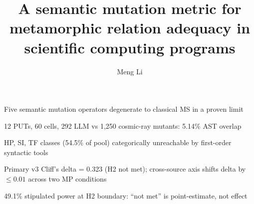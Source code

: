 \documentclass[review,12pt,authoryear]{elsarticle}
\begin{document}
\begin{frontmatter}

\title{A semantic mutation metric for metamorphic relation adequacy in scientific computing programs}

\author[a]{Meng Li}


\begin{highlights}
\item Five semantic mutation operators degenerate to classical MS in a proven limit
\item 12 PUTs, 60 cells, 292 LLM vs 1,250 cosmic-ray mutants: 5.14\% AST overlap
\item HP, SI, TF classes (54.5\% of pool) categorically unreachable by first-order syntactic tools
\item Primary v3 Cliff's delta = 0.323 (H2 not met); cross-source axis shifts delta by $\leq 0.01$ across two MP conditions
\item 49.1\% stipulated power at H2 boundary: ``not met'' is point-estimate, not effect
\end{highlights}


\end{frontmatter}
\end{document}
